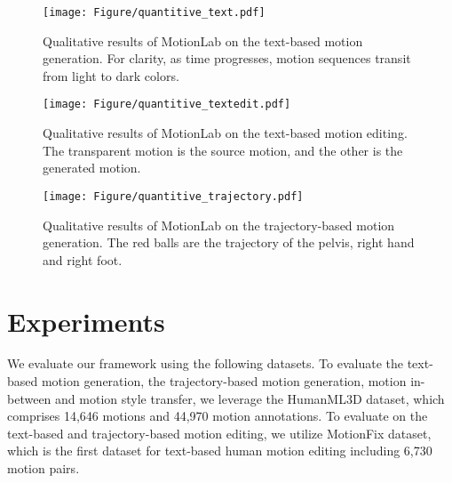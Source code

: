 \begin{figure*}[!h]
  \centering
  \texttt{[image: Figure/quantitive\_text.pdf]}
  \caption{Qualitative results of MotionLab on the text-based motion generation. For clarity, as time progresses, motion sequences transit from light to dark colors.}
  \label{fig:quantitive_text}
\end{figure*} 

\begin{figure*}[!h]
  \centering
  \texttt{[image: Figure/quantitive\_textedit.pdf]}
  \caption{Qualitative results of MotionLab on the text-based motion editing. The transparent motion is the source motion, and the other is the generated motion.}
  \label{fig:quantitive_edit}
\end{figure*} 

\begin{figure*}[!h]
  \centering
  \texttt{[image: Figure/quantitive\_trajectory.pdf]}
  \caption{Qualitative results of MotionLab on the trajectory-based motion generation. The red balls are the trajectory of the pelvis, right hand and right foot.}
  \label{fig:quantitive_trajectory}
\end{figure*} 

\section{Experiments}
\label{sec:experiments}
We evaluate our framework using the following datasets. To evaluate the text-based motion generation, the trajectory-based motion generation, motion in-between and motion style transfer, we leverage the HumanML3D \cite{Guo_2022_CVPR} dataset, which comprises 14,646 motions and 44,970 motion annotations. To evaluate on the text-based and trajectory-based motion editing, we utilize MotionFix \cite{athanasiou2024motionfix} dataset, which is the first dataset for text-based human motion editing including 6,730 motion pairs. 


